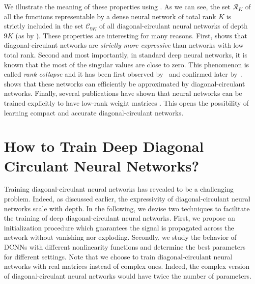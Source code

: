 \noindent
We illustrate the meaning of these properties using .
As we can see, the set $\mathcal{R}_K$ of all the functions representable by a dense neural network of total rank $K$ is strictly included in the set $\mathcal C_{9K}$ of all diagonal-circulant neural networks of depth $9K$ (as by ).
These properties are interesting for many reasons. 
First,  shows that diagonal-circulant networks are \emph{strictly more expressive} than networks with low total rank. 
Second and most importantly, in standard deep neural networks, it is known that the most of the singular values are close to zero. This phenomenon is called \emph{rank collapse} and it has been first observed by~\citet{saxe2013exact} and confirmed later by~\citet{sedghi2018singular,arora2019implicit}.
 shows that these networks can efficiently be approximated by diagonal-circulant networks.
Finally, several publications have shown that neural networks can be trained explicitly to have low-rank weight matrices \cite{chong18eccv, goyal2019compression}.
This opens the possibility of learning compact and accurate diagonal-circulant networks.


\section{How to Train Deep Diagonal Circulant Neural Networks?}
\label{section:ch4-how_to_train_deep_diagonal_circulant_neural_networks}

Training diagonal-circulant neural networks has revealed to be a challenging problem.
Indeed, as discussed earlier, the expressivity of diagonal-circulant neural networks scale with depth.
In the following, we devise two techniques to facilitate the training of deep diagonal-circulant neural networks.
First, we propose an initialization procedure which guarantees the signal is propagated across the network without vanishing nor exploding.
Secondly, we study the behavior of DCNNs with different nonlinearity functions and determine the best parameters for different settings. 
Note that we choose to train diagonal-circulant neural networks with real matrices instead of complex ones.
Indeed, the complex version of diagonal-circulant neural networks would have twice the number of parameters.



